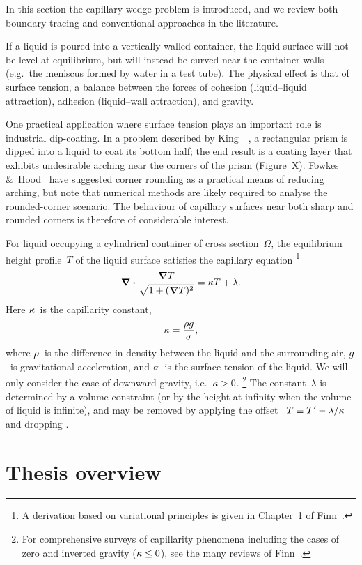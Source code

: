 In this section the capillary wedge problem is introduced,
and we review both boundary tracing and conventional approaches
in the literature.

If a liquid is poured into a vertically-walled container,
the liquid surface will not be level at equilibrium,
but will instead be curved near the container walls
(e.g.~the meniscus formed by water in a test tube).
The physical effect is that of surface tension,
a balance between the forces of cohesion (liquid--liquid attraction),
adhesion (liquid--wall attraction), and gravity.

One practical application
where surface tension plays an important role
is industrial dip-coating.
In a problem described by
King~\etal~\cite{king-1999-laplace-young-near-corner},
a rectangular prism is dipped into a liquid to coat its bottom half;
the end result is a coating layer
that exhibits undesirable arching near the corners of the prism
(Figure~X). %
Fowkes \&~Hood~\cite{fowkes-1998-surface-tension-effects-wedge}
have suggested corner rounding as a practical means of reducing arching,
but note that numerical methods are likely required
to analyse the rounded-corner scenario.
The behaviour of capillary surfaces near both sharp and rounded corners
is therefore of considerable interest.

For liquid occupying a cylindrical container of cross section~$\Omega$,
the equilibrium height profile~$T$ of the liquid surface
satisfies the capillary equation%
\footnote{
  A derivation based on variational principles is given
  in Chapter~1 of Finn~\cite{finn-1986-equilibrium-capillary-surfaces}.
}
\begin{equation}
  \mathop{}\!\boldsymbol{\mathbf{\nabla}} \boldsymbol{\cdot} \frac{\mathop{}\!\boldsymbol{\mathbf{\nabla}} T}{\sqrt{1 + (\mathop{}\!\boldsymbol{\mathbf{\nabla}} T)^2}} = \kappa T + \lambda.
  \label{eq:capillary}
\end{equation}
Here $\kappa$~is the capillarity constant,
\begin{equation}
  \kappa = \frac{\rho g}{\sigma},
  \label{eq:capillarity-constant}
\end{equation}
where $\rho$~is the difference in density
between the liquid and the surrounding air,
$g$~is gravitational acceleration,
and $\sigma$~is the surface tension of the liquid.
We will only consider the case of downward gravity,
i.e.~$\kappa > 0$.%
\footnote{
  For comprehensive surveys of capillarity phenomena including the cases of
  zero and inverted gravity ($\kappa \le 0$),
  see the many reviews of Finn~\cite{
    finn-1974-capillarity-phenomena,
    finn-2002-eight-properties-capillary-surfaces,
    finn-2002-some-properties-capillary-surfaces
  }.
}
The constant~$\lambda$ is determined by a volume constraint
(or by the height at infinity when the volume of liquid is infinite),
and may be removed by applying the offset~%
  $T \equiv T' - \lambda / \kappa$
and dropping \offsetmarks.


\section{Thesis overview}
